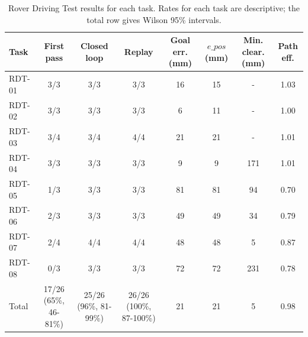 \begin{table}[htbp]
\centering
\caption{Rover Driving Test results for each task. Rates for each task are descriptive; the total row gives Wilson 95\% intervals.}
\label{tab:rdt_per_task}
\small
\begin{tabular}{lccccccc}
\toprule
Task & First pass & Closed loop & Replay & Goal err. (mm) & $e\_{pos}$ (mm) & Min. clear. (mm) & Path eff. \\
\midrule
RDT-01 & 3/3 & 3/3 & 3/3 & 16 & 15 & - & 1.03 \\
RDT-02 & 3/3 & 3/3 & 3/3 & 6 & 11 & - & 1.00 \\
RDT-03 & 3/4 & 3/4 & 4/4 & 21 & 21 & - & 1.01 \\
RDT-04 & 3/3 & 3/3 & 3/3 & 9 & 9 & 171 & 1.01 \\
RDT-05 & 1/3 & 3/3 & 3/3 & 81 & 81 & 94 & 0.70 \\
RDT-06 & 2/3 & 3/3 & 3/3 & 49 & 49 & 34 & 0.79 \\
RDT-07 & 2/4 & 4/4 & 4/4 & 48 & 48 & 5 & 0.87 \\
RDT-08 & 0/3 & 3/3 & 3/3 & 72 & 72 & 231 & 0.78 \\
Total & 17/26 (65\%, 46-81\%) & 25/26 (96\%, 81-99\%) & 26/26 (100\%, 87-100\%) & 21 & 21 & 5 & 0.98 \\
\bottomrule
\end{tabular}
\end{table}
